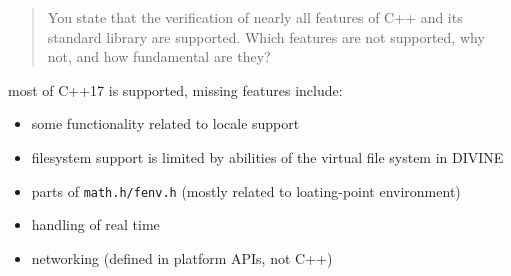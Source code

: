 \documentclass[aspectratio=169, fi]{paradise-slide}
\newcommand{\rquote}[1]{\begin{quote}#1\end{quote}\bigskip\setlength{\leftmargini}{1em}}
\begin{document}
\begin{frame}[noframenumbering]{\qtitle}
  \rquote{You state that the verification of nearly all features of C++ and its standard library are
    supported. Which features are not supported, why not, and how fundamental are they?}

  most of C++17 is supported, missing features include:
  \begin{itemize}
    \item some functionality related to locale support
      \pause

    \item filesystem support is limited by abilities of the virtual file system in DIVINE
      \pause

    \item parts of \texttt{math.h/fenv.h} (mostly related to loating-point environment)
      \pause
    \item handling of real time
      \pause
    \item networking (defined in platform APIs, not C++)
  \end{itemize}
\end{frame}
\end{document}
